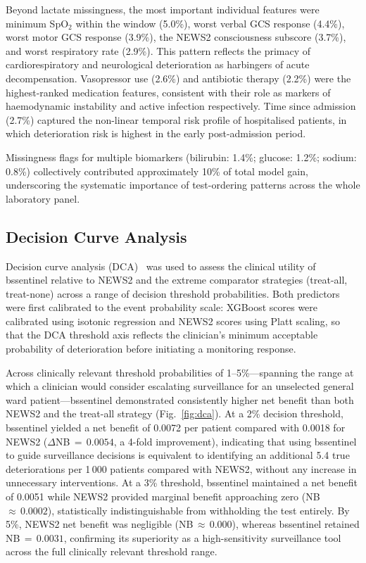 \documentclass[12pt]{article}
\begin{document}
Beyond lactate missingness, the most important individual features were
minimum SpO$_2$ within the window (5.0\%), worst verbal GCS response (4.4\%),
worst motor GCS response (3.9\%), the NEWS2 consciousness subscore (3.7\%),
and worst respiratory rate (2.9\%). This pattern reflects the primacy of
cardiorespiratory and neurological deterioration as harbingers of acute
decompensation. Vasopressor use (2.6\%) and antibiotic therapy (2.2\%) were
the highest-ranked medication features, consistent with their role as markers
of haemodynamic instability and active infection respectively.
Time since admission (2.7\%) captured the non-linear temporal risk profile
of hospitalised patients, in which deterioration risk is highest in the early
post-admission period.

Missingness flags for multiple biomarkers (bilirubin: 1.4\%; glucose: 1.2\%;
sodium: 0.8\%) collectively contributed approximately 10\% of total model
gain, underscoring the systematic importance of test-ordering patterns across
the whole laboratory panel.

\subsection*{Decision Curve Analysis}

Decision curve analysis (DCA)~\cite{vickers2006dca} was used to assess the
clinical utility of bssentinel relative to NEWS2 and the extreme comparator
strategies (treat-all, treat-none) across a range of decision threshold
probabilities. Both predictors were first calibrated to the event probability
scale: XGBoost scores were calibrated using isotonic regression and NEWS2
scores using Platt scaling, so that the DCA threshold axis reflects the
clinician's minimum acceptable probability of deterioration before initiating
a monitoring response.

Across clinically relevant threshold probabilities of 1--5\%---spanning the
range at which a clinician would consider escalating surveillance for an
unselected general ward patient---bssentinel demonstrated consistently higher
net benefit than both NEWS2 and the treat-all strategy
(Fig.~\ref{fig:dca}). At a 2\% decision threshold, bssentinel yielded a net
benefit of 0.0072 per patient compared with 0.0018 for NEWS2
($\Delta$NB\,$=\,0.0054$, a 4-fold improvement), indicating that using
bssentinel to guide surveillance decisions is equivalent to identifying an
additional 5.4 true deteriorations per 1\,000 patients compared with NEWS2,
without any increase in unnecessary interventions. At a 3\% threshold,
bssentinel maintained a net benefit of 0.0051 while NEWS2 provided marginal
benefit approaching zero (NB\,$\approx\,0.0002$), statistically
indistinguishable from withholding the test entirely. By 5\%, NEWS2 net
benefit was negligible (NB\,$\approx\,0.000$), whereas bssentinel retained
NB\,$=\,0.0031$, confirming its superiority as a high-sensitivity surveillance
tool across the full clinically relevant threshold range.
\end{document}
